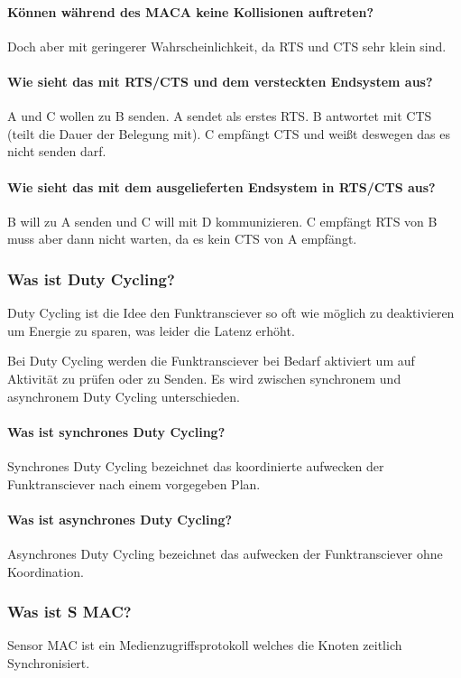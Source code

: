 	\paragraph{Können während des MACA keine Kollisionen auftreten?}
	Doch aber mit geringerer Wahrscheinlichkeit, da RTS und CTS sehr klein sind.
	
	\paragraph{Wie sieht das mit RTS/CTS und dem versteckten Endsystem aus?}
	A und C wollen zu B senden. A sendet als erstes RTS. B antwortet mit CTS (teilt die Dauer der Belegung mit). C empfängt CTS und weißt deswegen das es nicht senden darf.
	
	\paragraph{Wie sieht das mit dem ausgelieferten Endsystem in RTS/CTS aus?}
	B will zu A senden und C will mit D kommunizieren. C empfängt RTS von B muss aber dann nicht warten, da es kein CTS von A empfängt.
	
	\subsubsection{Was ist Duty\- Cycling?}
	Duty\- Cycling ist die Idee den Funktransciever so oft wie möglich zu deaktivieren um Energie zu sparen, was leider die Latenz erhöht.
	
	Bei Duty\- Cycling werden die Funktransciever bei Bedarf aktiviert um auf Aktivität zu prüfen oder zu Senden.
	Es wird zwischen synchronem und asynchronem Duty\- Cycling unterschieden.
	\paragraph{Was ist synchrones Duty\- Cycling?}
	Synchrones Duty\- Cycling bezeichnet das koordinierte aufwecken der Funktransciever nach einem vorgegeben Plan.
	\paragraph{Was ist asynchrones Duty\- Cycling?}
	Asynchrones Duty\- Cycling bezeichnet das aufwecken der Funktransciever ohne Koordination.
	
	\subsubsection{Was ist S\- MAC?}
	Sensor MAC ist ein Medienzugriffsprotokoll welches die Knoten zeitlich Synchronisiert.

